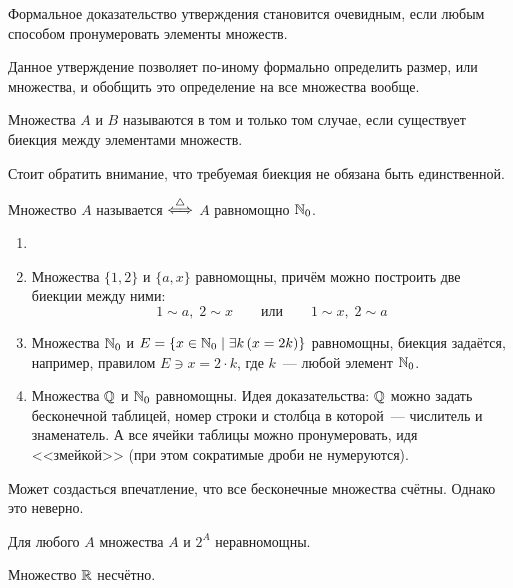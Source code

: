 Формальное доказательство утверждения становится очевидным, если любым способом пронумеровать элементы множеств.

Данное утверждение позволяет по-иному формально определить размер, или  множества, и обобщить это определение на все множества вообще.
\begin{definition}
    Множества $ A $ и $ B $ называются  в том и только том случае,
    если существует биекция между элементами множеств.
\end{definition}
Стоит обратить внимание, что требуемая биекция не обязана быть единственной.

\begin{definition}
    Множество $ A $ называется  $ \overset{\triangle}{\Longleftrightarrow} $ $ A $ равномощно $ \mathbb{N}_0 $.
\end{definition}

\begin{example}
    \begin{enumerate}
        \item[]
        \item
            Множества $ \{1, 2\} $ и $ \{a, x\} $ равномощны, причём можно построить две биекции между ними:
            \[
                1 \sim a, \; 2 \sim x \qquad \text{или} \qquad 1 \sim x, \; 2 \sim a
            \]
        \item
            Множества $ \mathbb{N}_0 $ и $ E = \{ x \in \mathbb{N}_0 \mid \exists k \, (x = 2k) \} $ равномощны, биекция задаётся, например, правилом $ E \ni x = 2 \cdot k $, где $ k $~--- любой элемент $ \mathbb{N}_0 $.
        \item
            Множества $ \mathbb{Q} $ и $ \mathbb{N}_0 $ равномощны.
            Идея доказательства: $ \mathbb{Q} $ можно задать бесконечной таблицей, номер строки и столбца в которой~--- числитель и знаменатель.
            А все ячейки таблицы можно пронумеровать, идя <<змейкой>> (при этом сократимые дроби не нумеруются).
    \end{enumerate}
\end{example}

Может создасться впечатление, что все бесконечные множества счётны.
Однако это неверно.

\begin{theorem}[Кантора]
    Для любого $ A $ множества $ A $ и $ 2^A $ неравномощны.
\end{theorem}

\begin{statement}
    Множество $ \mathbb{R} $ несчётно.
\end{statement}

